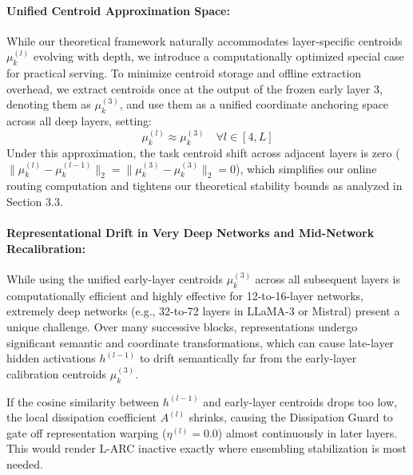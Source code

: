 \paragraph{Unified Centroid Approximation Space:} While our theoretical framework naturally accommodates layer-specific centroids $\mu_k^{(l)}$ evolving with depth, we introduce a computationally optimized special case for practical serving. To minimize centroid storage and offline extraction overhead, we extract centroids once at the output of the frozen early layer 3, denoting them as $\mu_k^{(3)}$, and use them as a unified coordinate anchoring space across all deep layers, setting:
\begin{equation}
\mu_k^{(l)} \approx \mu_k^{(3)} \quad \forall l \in [4, L]
\label{eq:centroid_approx}
\end{equation}
Under this approximation, the task centroid shift across adjacent layers is zero ($\|\mu_k^{(l)} - \mu_k^{(l-1)}\|_2 = \|\mu_k^{(3)} - \mu_k^{(3)}\|_2 = 0$), which simplifies our online routing computation and tightens our theoretical stability bounds as analyzed in Section 3.3.

\paragraph{Representational Drift in Very Deep Networks and Mid-Network Recalibration:}
While using the unified early-layer centroids $\mu_k^{(3)}$ across all subsequent layers is computationally efficient and highly effective for 12-to-16-layer networks, extremely deep networks (e.g., 32-to-72 layers in LLaMA-3 or Mistral) present a unique challenge. Over many successive blocks, representations undergo significant semantic and coordinate transformations, which can cause late-layer hidden activations $h^{(l-1)}$ to drift semantically far from the early-layer calibration centroids $\mu_k^{(3)}$. 

If the cosine similarity between $h^{(l-1)}$ and early-layer centroids drops too low, the local dissipation coefficient $A^{(l)}$ shrinks, causing the Dissipation Guard to gate off representation warping ($\eta^{(l)} = 0.0$) almost continuously in later layers. This would render L-ARC inactive exactly where ensembling stabilization is most needed. 

